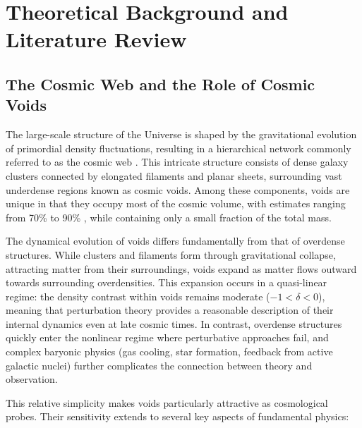 \documentclass[12pt]{report}
\begin{document}
\chapter{Theoretical Background and Literature Review}

\section{The Cosmic Web and the Role of Cosmic Voids}

The large-scale structure of the Universe is shaped by the gravitational evolution of primordial density fluctuations, resulting in a hierarchical network commonly referred to as the cosmic web \citep{Bond1991,VanDeWeygaert2011}. This intricate structure consists of dense galaxy clusters connected by elongated filaments and planar sheets, surrounding vast underdense regions known as cosmic voids. Among these components, voids are unique in that they occupy most of the cosmic volume, with estimates ranging from 70\% to 90\% \citep{VanDeWeygaert2011}, while containing only a small fraction of the total mass.

The dynamical evolution of voids differs fundamentally from that of overdense structures. While clusters and filaments form through gravitational collapse, attracting matter from their surroundings, voids expand as matter flows outward towards surrounding overdensities. This expansion occurs in a quasi-linear regime: the density contrast within voids remains moderate ($-1 < \delta < 0$), meaning that perturbation theory provides a reasonable description of their internal dynamics even at late cosmic times. In contrast, overdense structures quickly enter the nonlinear regime where perturbative approaches fail, and complex baryonic physics (gas cooling, star formation, feedback from active galactic nuclei) further complicates the connection between theory and observation.

This relative simplicity makes voids particularly attractive as cosmological probes. Their sensitivity extends to several key aspects of fundamental physics:
\end{document}
